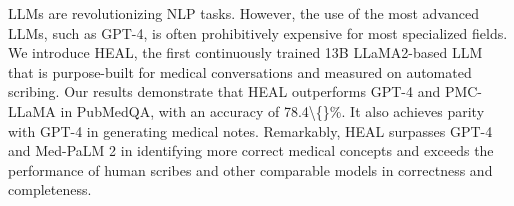 LLMs are revolutionizing NLP tasks. However, the use of the most advanced LLMs, such as GPT-4, is often prohibitively expensive for most specialized fields. We introduce HEAL, the first continuously trained 13B LLaMA2-based LLM that is purpose-built for medical conversations and measured on automated scribing. Our results demonstrate that HEAL outperforms GPT-4 and PMC-LLaMA in PubMedQA, with an accuracy of 78.4\textbackslash\{\}\%. It also achieves parity with GPT-4 in generating medical notes. Remarkably, HEAL surpasses GPT-4 and Med-PaLM 2 in identifying more correct medical concepts and exceeds the performance of human scribes and other comparable models in correctness and completeness.